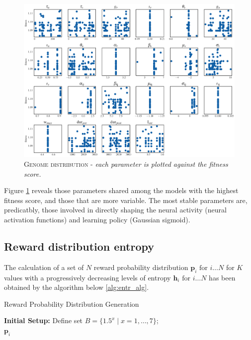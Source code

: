 \begin{figure}[H]
    \centering
    \includegraphics[width=1.\textwidth]{figures/evo_tabplot.png}
    \caption{\textsc{Genome distribution} - \textit{each parameter is plotted against the fitness score.}}
    \label{fig:evo_tabplot}
\end{figure}

\noindent Figure \ref{fig:evo_tabplot} reveals those parameters shared among the models with the highest fitness score, and those that are more variable.
The most stable parameters are, predicatbly, those involved in directly shaping the neural activity (neural activation functions) and learning policy (Gaussian sigmoid).


\subsection{Reward distribution entropy}\label{sec:appendix_entropy}

\noindent The calculation of a set of $N$ reward probability distribution $\mathbf{p}_{i}\text{  for  } i\ldots N$ for $K$ values with a progressively decreasing levels of entropy $\mathbf{h}_{i}\text{  for  } i\ldots N$ has been obtained by the algorithm below \ref{alg:entr_alg}.

\begin{algorithm}[H]
\caption{Reward Probability Distribution Generation}
\label{alg:reward_distribution}
\SetAlgoLined
{}
\textbf{Initial Setup:}
Define set $B = \{1.5^x \mid x = 1, \ldots, 7\}$; \\
\Return ${\mathbf{p}_i}$
\end{algorithm}\label{alg:entr_alg}


